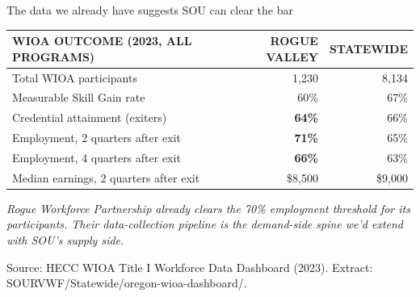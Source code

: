 \documentclass[aspectratio=169,11pt]{beamer}
\newcommand{\eyebrow}[1]{%
  {\sffamily\fontsize{7.5pt}{9pt}\selectfont
   \color{textMuted}%
   \MakeUppercase{#1}%
  }%
}
\newcommand{\monoLabel}[1]{%
  {\ttfamily\fontsize{7.5pt}{9pt}\selectfont\color{textMuted}#1}%
}
\newcommand{\theEyebrowText}{}
\newcommand{\frametitleEyebrow}[1]{\renewcommand{\theEyebrowText}{#1}}
\begin{document}
\frametitleEyebrow{Evidence / Rogue Valley already outperforms statewide}
\begin{frame}{The data we already have suggests SOU can clear the bar}
  \centering
  \rmfamily\fontsize{9.4pt}{11.8pt}\selectfont
  \color{textPrimary}
  \renewcommand{\arraystretch}{1.22}
  \begin{tabular}{@{}p{6.4cm}rr@{}}
    \toprule
    \eyebrow{WIOA outcome (2023, all programs)}
      & \eyebrow{rogue valley}
      & \eyebrow{statewide}\\
    \midrule
    Total WIOA participants
      & 1{,}230 & 8{,}134\\
    \addlinespace[1pt]
    Measurable Skill Gain rate
      & 60\% & 67\%\\
    \addlinespace[1pt]
    Credential attainment (exiters)
      & \textbf{64\%} & 66\%\\
    \addlinespace[1pt]
    Employment, 2 quarters after exit
      & \textbf{71\%} & 65\%\\
    \addlinespace[1pt]
    Employment, 4 quarters after exit
      & \textbf{66\%} & 63\%\\
    \addlinespace[1pt]
    Median earnings, 2 quarters after exit
      & \$8{,}500 & \$9{,}000\\
    \bottomrule
  \end{tabular}
  \vspace{8pt}\par
  {\itshape\color{textSecondary}\fontsize{10pt}{13pt}\selectfont
   Rogue Workforce Partnership already clears the 70\% employment
   threshold for its participants. Their data-collection pipeline
   is the demand-side spine we'd extend with SOU's supply side.}\par
  \vspace{4pt}
  \monoLabel{Source: HECC WIOA Title I Workforce Data Dashboard (2023). Extract: SOURVWF/Statewide/oregon-wioa-dashboard/.}
\end{frame}
\end{document}
